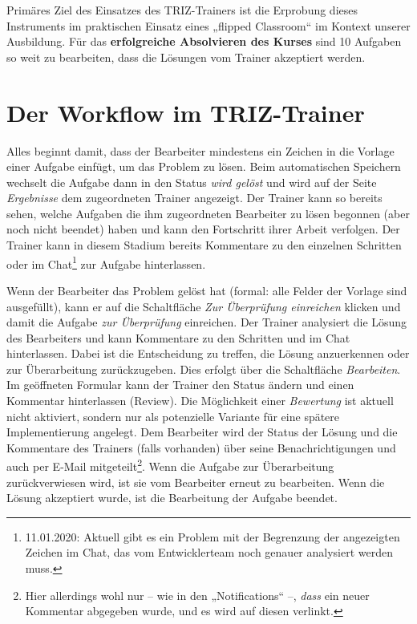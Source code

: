 \documentclass[11pt,a4paper]{article}
\begin{document}
Primäres Ziel des Einsatzes des TRIZ-Trainers ist die Erprobung dieses
Instruments im praktischen Einsatz eines „flipped Classroom“ im Kontext
unserer Ausbildung.  Für das \textbf{erfolgreiche Absolvieren des Kurses} sind
10 Aufgaben so weit zu bearbeiten, dass die Lösungen vom Trainer akzeptiert
werden. 

\section{Der Workflow im TRIZ-Trainer}

Alles beginnt damit, dass der Bearbeiter mindestens ein Zeichen in die Vorlage
einer Aufgabe einfügt, um das Problem zu lösen. Beim automatischen Speichern
wechselt die Aufgabe dann in den Status \emph{wird gelöst} und wird auf der
Seite \emph{Ergebnisse} dem zugeordneten Trainer angezeigt. Der Trainer kann
so bereits sehen, welche Aufgaben die ihm zugeordneten Bearbeiter zu lösen
begonnen (aber noch nicht beendet) haben und kann den Fortschritt ihrer Arbeit
verfolgen. Der Trainer kann in diesem Stadium bereits Kommentare zu den
einzelnen Schritten oder im Chat\footnote{11.01.2020: Aktuell gibt es ein
  Problem mit der Begrenzung der angezeigten Zeichen im Chat, das vom
  Entwicklerteam noch genauer analysiert werden muss.} zur Aufgabe
hinterlassen.

Wenn der Bearbeiter das Problem gelöst hat (formal: alle Felder der Vorlage
sind ausgefüllt), kann er auf die Schaltfläche \emph{Zur Überprüfung
  einreichen} klicken und damit die Aufgabe \emph{zur Überprüfung} einreichen.
Der Trainer analysiert die Lösung des Bearbeiters und kann Kommentare zu den
Schritten und im Chat hinterlassen. Dabei ist die Entscheidung zu treffen, die
Lösung anzuerkennen oder zur Überarbeitung zurückzugeben. Dies erfolgt über
die Schaltfläche \emph{Bearbeiten}. Im geöffneten Formular kann der Trainer
den Status ändern und einen Kommentar hinterlassen (Review).  Die Möglichkeit
einer \emph{Bewertung} ist aktuell nicht aktiviert, sondern nur als
potenzielle Variante für eine spätere Implementierung angelegt. Dem Bearbeiter
wird der Status der Lösung und die Kommentare des Trainers (falls vorhanden)
über seine Benachrichtigungen und auch per E-Mail mitgeteilt\footnote{Hier
  allerdings wohl nur -- wie in den „Notifications“ --, \emph{dass} ein neuer
  Kommentar abgegeben wurde, und es wird auf diesen verlinkt.}.  Wenn die
Aufgabe zur Überarbeitung zurückverwiesen wird, ist sie vom Bearbeiter erneut
zu bearbeiten. Wenn die Lösung akzeptiert wurde, ist die Bearbeitung der
Aufgabe beendet.
\enlargethispage{1em}
\end{document}
